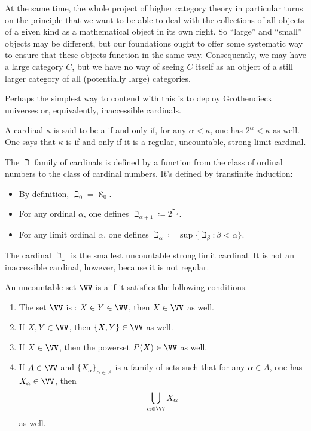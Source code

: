 At the same time, the whole project of higher category theory in particular turns on the principle that we want to be able to deal with the collections of all objects of a given kind as a mathematical object in its own right.
So \enquote{large} and \enquote{small} objects may be different,
but our foundations ought to offer some systematic way to ensure that these objects function in the same way.
Consequently, we may have a large category $C$, but we have no way of seeing $C$ itself as an object of a still larger category of all (potentially large) categories.

Perhaps the simplest way to contend with this is to deploy Grothendieck universes or, equivalently, inaccessible cardinals.

\begin{definition}
	A cardinal $\kappa$ is said to be a  if and only if, for any $\alpha<\kappa$, one has $2^\alpha<\kappa$ as well.
	One says that $\kappa$ is  if and only if it is a regular, uncountable, strong limit cardinal.
\end{definition}

\begin{eg}
	The $\beth$ family of cardinals is defined by a function from the class of ordinal numbers to the class of cardinal numbers.
	It's defined by transfinite induction:
	\begin{itemize}
		\item By definition, $ \beth_0 = \aleph_0 $.
		\item For any ordinal $ \alpha $, one defines $ \beth_{\alpha+1} \coloneq 2^{\beth_{\alpha}} $.
		\item For any limit ordinal $ \alpha $, one defines $ \beth_{\alpha} \coloneq \sup \{ \beth_{\beta} : \beta < \alpha \} $.
	\end{itemize}
	The cardinal $ \beth_{\omega} $ is the smallest uncountable strong limit cardinal.
	It is not an inaccessible cardinal, however, because it is not regular.
\end{eg}

\begin{definition}%
\label{dfn:uni}
	An uncountable set $\VV$ is a \cite[Exposé I, \S 0 and Appendix]{Anonymous:1972tk} if it satisfies the following conditions.
	\begin{enumerate}
		\item The set $\VV$ is : $X\in Y\in\VV$, then $X\in\VV$ as well.
		\item If $X,Y\in\VV$, then $\{X,Y\}\in\VV$ as well.
		\item If $X\in\VV$, then the powerset $P(X)\in\VV$ as well.
		\item If $A\in\VV$ and $\{X_{\alpha}\}_{\alpha\in A}$ is a family of sets such that for any $\alpha\in A$, one has $X_{\alpha}\in\VV$, then
		\[
		\bigcup_{\alpha\in\VV}X_{\alpha}
		\]
		as well.
	\end{enumerate}
\end{definition}

